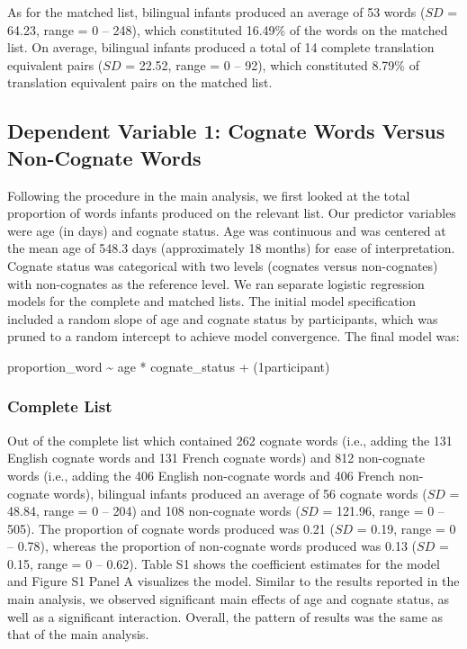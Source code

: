 \documentclass[
  ,man,floatsintext]{apa6}
\begin{document}
As for the matched list, bilingual infants produced an average of 53 words (\(SD\) = 64.23, range = 0 -- 248), which constituted 16.49\% of the words on the matched list. On average, bilingual infants produced a total of 14 complete translation equivalent pairs (\(SD\) = 22.52, range = 0 -- 92), which constituted 8.79\% of translation equivalent pairs on the matched list.

\hypertarget{dependent-variable-1-cognate-words-versus-non-cognate-words}{%
\subsection{Dependent Variable 1: Cognate Words Versus Non-Cognate Words}\label{dependent-variable-1-cognate-words-versus-non-cognate-words}}

Following the procedure in the main analysis, we first looked at the total proportion of words infants produced on the relevant list. Our predictor variables were age (in days) and cognate status. Age was continuous and was centered at the mean age of 548.3 days (approximately 18 months) for ease of interpretation. Cognate status was categorical with two levels (cognates versus non-cognates) with non-cognates as the reference level. We ran separate logistic regression models for the complete and matched lists. The initial model specification included a random slope of age and cognate status by participants, which was pruned to a random intercept to achieve model convergence. The final model was:

proportion\_word \textasciitilde{} age * cognate\_status + (1\textbar participant)

\hypertarget{complete-list}{%
\subsubsection{Complete List}\label{complete-list}}

Out of the complete list which contained 262 cognate words (i.e., adding the 131 English cognate words and 131 French cognate words) and 812 non-cognate words (i.e., adding the 406 English non-cognate words and 406 French non-cognate words), bilingual infants produced an average of 56 cognate words (\(SD\) = 48.84, range = 0 -- 204) and 108 non-cognate words (\(SD\) = 121.96, range = 0 -- 505). The proportion of cognate words produced was 0.21 (\(SD\) = 0.19, range = 0 -- 0.78), whereas the proportion of non-cognate words produced was 0.13 (\(SD\) = 0.15, range = 0 -- 0.62). Table S1 shows the coefficient estimates for the model and Figure S1 Panel A visualizes the model. Similar to the results reported in the main analysis, we observed significant main effects of age and cognate status, as well as a significant interaction. Overall, the pattern of results was the same as that of the main analysis.
\end{document}
